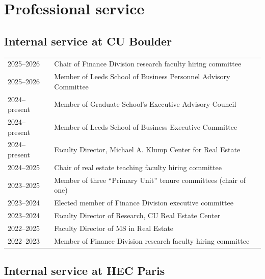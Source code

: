 \documentclass[a4paper]{article}
\begin{document}
\section*{Professional service}

\subsection*{Internal service at CU Boulder}

\begin{tabular}{p{2cm} p{14.7cm}}

2025--2026 & Chair of Finance Division research faculty hiring committee\\[0.25cm]

2025--2026 & Member of Leeds School of Business Personnel Advisory Committee\\[0.25cm]

2024--present & Member of Graduate School's Executive Advisory Council\\[0.25cm]

2024--present & Member of Leeds School of Business Executive Committee\\[0.25cm]

2024--present & Faculty Director, Michael A. Klump Center for Real Estate\\[0.25cm]

2024--2025 & Chair of real estate teaching faculty hiring committee \\[0.25cm]

2023--2025 & Member of three ``Primary Unit'' tenure committees (chair of one)\\[0.25cm]

2023--2024 & Elected member of Finance Division executive committee\\[0.25cm] 

2023--2024 & Faculty Director of Research, CU Real Estate Center\\[0.25cm] 

2022--2025 & Faculty Director of MS in Real Estate\\[0.25cm] 

2022--2023 & Member of Finance Division research faculty hiring committee
\end{tabular}

\subsection*{Internal service at HEC Paris}
\end{document}
